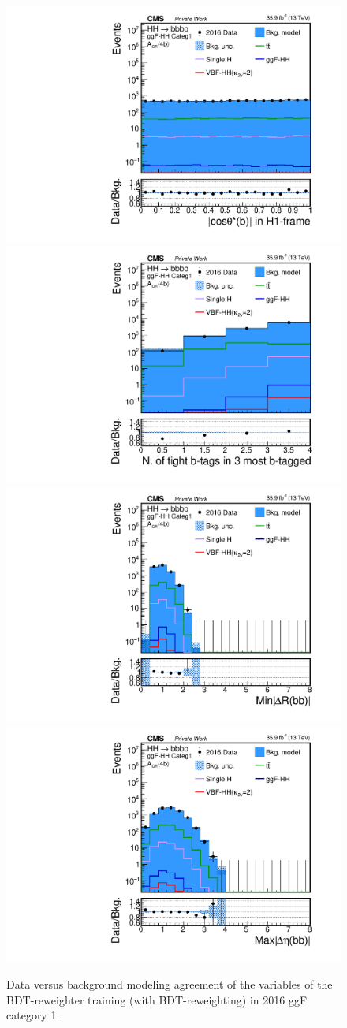 \begin{figure}[htbp!]
\begin{center}
\includegraphics[width=0.24\linewidth]{Figures/Modeling/background/plotsDatadrivenWithBDT/2016/GGFcateg1_CR_110/Histogram/plot2016_abs_costh_H1_b1_h1cm_Btag4_GGFcateg1_CR_110_Histogram_log.pdf}
\includegraphics[width=0.24\linewidth]{Figures/Modeling/background/plotsDatadrivenWithBDT/2016/GGFcateg1_CR_110/Histogram/plot2016_nBtagTightonMediumWP_Btag4_GGFcateg1_CR_110_Histogram_log.pdf}
\includegraphics[width=0.24\linewidth]{Figures/Modeling/background/plotsDatadrivenWithBDT/2016/GGFcateg1_CR_110/Histogram/plot2016_min_4b_deltaR_Btag4_GGFcateg1_CR_110_Histogram_log.pdf}
\includegraphics[width=0.24\linewidth]{Figures/Modeling/background/plotsDatadrivenWithBDT/2016/GGFcateg1_CR_110/Histogram/plot2016_max_4b_deltaEta_Btag4_GGFcateg1_CR_110_Histogram_log.pdf}
\end{center}
\caption{Data versus background modeling agreement of the variables of the BDT-reweighter training (with  BDT-reweighting) in 2016 ggF category 1.}
\label{bkg:fig:bdtregvarggf1_2016}
\end{figure}

